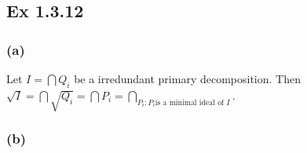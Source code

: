 \documentclass{article}
\theoremstyle{definition}
\begin{document}
\subsection*{Ex 1.3.12}

\subsubsection*{(a)}

Let $I = \bigcap Q_i$ be a irredundant primary decomposition. Then $\sqrt{I} =
\bigcap \sqrt{Q_i} = \bigcap P_i = \bigcap_{P_i : P_i \text{is a minimal ideal
of } I}$.

\subsubsection*{(b)}
\end{document}
